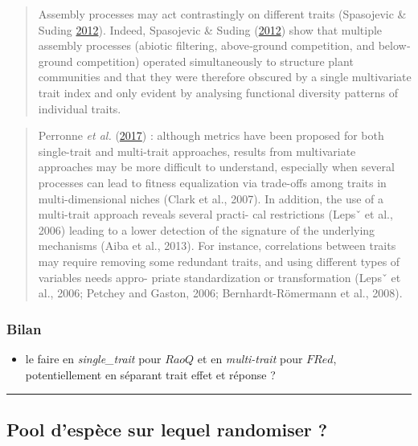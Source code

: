\documentclass[]{article}
\providecommand{\tightlist}{%
  \setlength{\itemsep}{0pt}\setlength{\parskip}{0pt}}
\begin{document}
\begin{quote}
Assembly processes may act contrastingly on different traits (Spasojevic
\& Suding \protect\hyperlink{ref-spasojevic2012}{2012}). Indeed,
Spasojevic \& Suding (\protect\hyperlink{ref-spasojevic2012}{2012}) show
that multiple assembly processes (abiotic filtering, above‐ground
competition, and below‐ground competition) operated simultaneously to
structure plant communities and that they were therefore obscured by a
single multivariate trait index and only evident by analysing functional
diversity patterns of individual traits.
\end{quote}

\begin{quote}
Perronne \emph{et al.} (\protect\hyperlink{ref-perronne2017}{2017}) :
although metrics have been proposed for both single-trait and
multi-trait approaches, results from multivariate approaches may be more
difficult to understand, especially when several processes can lead to
fitness equalization via trade-offs among traits in multi-dimensional
niches (Clark et al., 2007). In addition, the use of a multi-trait
approach reveals several practi- cal restrictions (Lepsˇ et al., 2006)
leading to a lower detection of the signature of the underlying
mechanisms (Aiba et al., 2013). For instance, correlations between
traits may require removing some redundant traits, and using different
types of variables needs appro- priate standardization or transformation
(Lepsˇ et al., 2006; Petchey and Gaston, 2006; Bernhardt-Römermann et
al., 2008).
\end{quote}

\subsubsection{Bilan}\label{bilan-1}

\begin{itemize}
\tightlist
\item
  le faire en \emph{single\_trait} pour \(RaoQ\) et en
  \emph{multi-trait} pour \(FRed\), potentiellement en séparant trait
  effet et réponse ?
\end{itemize}

\begin{center}\rule{0.5\linewidth}{\linethickness}\end{center}

\subsection{\texorpdfstring{\textbf{Pool d'espèce sur lequel randomiser
?}}{Pool d'espèce sur lequel randomiser ?}}\label{pool-despece-sur-lequel-randomiser}
\end{document}
